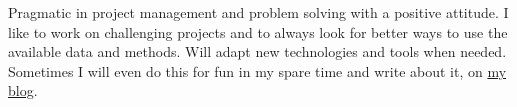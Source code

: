 

\begin{cvparagraph}

{Pragmatic in project management and problem solving with a positive attitude. I like to work on challenging projects and to always look for better ways to use the available data and methods. Will adapt new technologies and tools when needed. Sometimes I will even do this for fun in my spare time and write about it, on \href{https://bigger-tree.org}{my blog}. 
}

\end{cvparagraph}
